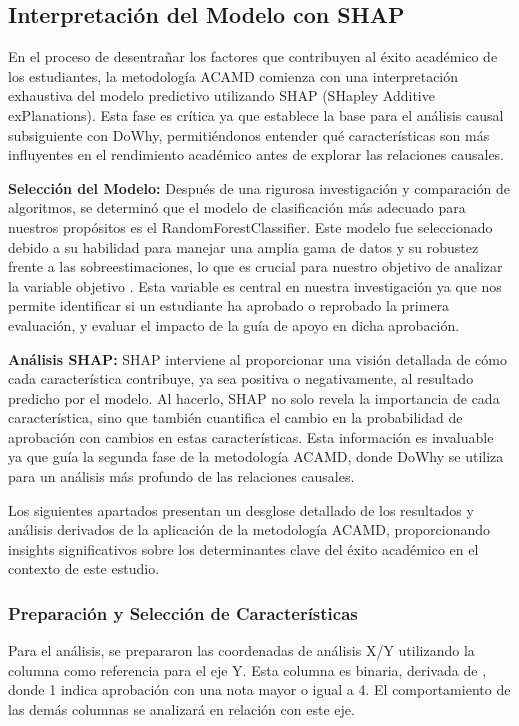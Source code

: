 \subsection{Interpretación del Modelo con SHAP}

En el proceso de desentrañar los factores que contribuyen al éxito académico de los estudiantes, la metodología ACAMD comienza con una interpretación exhaustiva del modelo predictivo utilizando SHAP (SHapley Additive exPlanations). Esta fase es crítica ya que establece la base para el análisis causal subsiguiente con DoWhy, permitiéndonos entender qué características son más influyentes en el rendimiento académico antes de explorar las relaciones causales.

\textbf{Selección del Modelo:} Después de una rigurosa investigación y comparación de algoritmos, se determinó que el modelo de clasificación más adecuado para nuestros propósitos es el RandomForestClassifier. Este modelo fue seleccionado debido a su habilidad para manejar una amplia gama de datos y su robustez frente a las sobreestimaciones, lo que es crucial para nuestro objetivo de analizar la variable objetivo . Esta variable es central en nuestra investigación ya que nos permite identificar si un estudiante ha aprobado o reprobado la primera evaluación, y evaluar el impacto de la guía de apoyo en dicha aprobación.

\textbf{Análisis SHAP:} SHAP interviene al proporcionar una visión detallada de cómo cada característica contribuye, ya sea positiva o negativamente, al resultado predicho por el modelo. Al hacerlo, SHAP no solo revela la importancia de cada característica, sino que también cuantifica el cambio en la probabilidad de aprobación con cambios en estas características. Esta información es invaluable ya que guía la segunda fase de la metodología ACAMD, donde DoWhy se utiliza para un análisis más profundo de las relaciones causales.

Los siguientes apartados presentan un desglose detallado de los resultados y análisis derivados de la aplicación de la metodología ACAMD, proporcionando insights significativos sobre los determinantes clave del éxito académico en el contexto de este estudio.


\subsubsection{Preparación y Selección de Características}

Para el análisis, se prepararon las coordenadas de análisis X/Y utilizando la columna  como referencia para el eje Y. Esta columna es binaria, derivada de , donde 1 indica aprobación con una nota mayor o igual a 4. El comportamiento de las demás columnas se analizará en relación con este eje.


